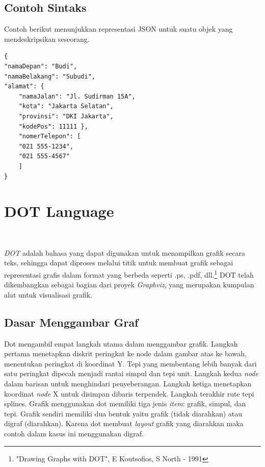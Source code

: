 \subsection{Contoh Sintaks}
\label{sec: Contoh Sintaks}
Contoh berikut menunjukkan representasi JSON untuk suatu objek yang mendeskripsikan seseorang.
\begin{lstlisting}
{ 
"namaDepan": "Budi", 
"namaBelakang": "Subudi", 
"alamat": { 
	"namaJalan": "Jl. Sudirman 15A", 
	"kota": "Jakarta Selatan", 
	"provinsi": "DKI Jakarta", 
	"kodePos": 11111 }, 
	"nomerTelepon": [ 
	"021 555-1234", 
	"021 555-4567" 
	] 
}
\end{lstlisting}

\section{DOT Language}
\label{sec: DOT Language}
~\cite{north:03:DOT}

\textit{DOT} adalah bahasa yang dapat digunakan untuk menampilkan grafik secara teks, sehingga dapat diproses melalui titik untuk membuat grafik sebagai representasi grafis dalam format yang berbeda seperti .ps, .pdf, dll.\footnote{"Drawing Graphs with DOT", E Koutsofios, S North - 1991} DOT telah dikembangkan sebagai bagian dari proyek \textit{Graphviz}, yang merupakan kumpulan alat untuk visualisasi grafik. 

\subsection{Dasar Menggambar Graf}
\label{sec: Dasar Menggambar Graf}
Dot mengambil empat langkah utama dalam menggambar grafik. Langkah pertama menetapkan diskrit peringkat ke node dalam gambar atas ke bawah, menentukan peringkat di koordinat Y. Tepi yang membentang lebih banyak dari satu peringkat dipecah menjadi rantai simpul dan tepi unit. Langkah kedua \textit{node} dalam barisan untuk menghindari penyeberangan. Langkah ketiga menetapkan koordinat \textit{node} X untuk disimpan dibaris terpendek. Langkah terakhir rute tepi splines. Grafik menggunakan dot memiliki tiga jenis \textit{item}: grafik, simpul, dan tepi. Grafik sendiri memiliki dua bentuk yaitu grafik (tidak diarahkan) atau digraf (diarahkan). Karena dot membuat \textit{layout} grafik yang diarahkan maka contoh dalam kasus ini menggunakan digraf. 

